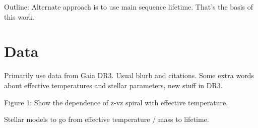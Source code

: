 Outline: Alternate approach is to use main sequence lifetime. That's the basis of this work.


\section{Data} \label{sec:data}

Primarily use data from Gaia DR3. Usual blurb and citations. Some extra words about effective temperatures and stellar parameters, new stuff in DR3.

Figure 1: Show the dependence of z-vz spiral with effective temperature.


Stellar models to go from effective temperature / mass to lifetime.



